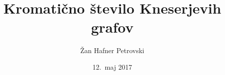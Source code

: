 \documentclass{beamer}
\title{Kromatično število Kneserjevih grafov}
\author{Žan Hafner Petrovski}
\institute{Fakulteta za matematiko in fiziko \\
Oddelek za matematiko}
\date{12.\ maj 2017}
\begin{document}

\begin{frame}
\titlepage
\end{frame}

\end{document}
